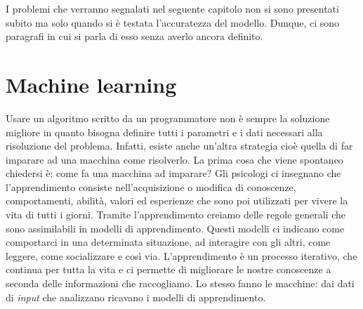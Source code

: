 I problemi che verranno segnalati nel seguente capitolo non si sono presentati subito ma solo quando si è testata l'accuratezza del modello. Dunque, ci sono paragrafi in cui si parla di esso senza averlo ancora definito.
\section{Machine learning}
Usare un algoritmo scritto da un programmatore non è sempre la soluzione migliore in quanto bisogna definire tutti i parametri e i dati necessari alla risoluzione del problema. Infatti, esiste anche un'altra strategia cioè quella di far imparare ad una macchina come risolverlo. La prima cosa che viene spontaneo chiedersi è: come fa una macchina ad imparare? Gli psicologi ci insegnano che l’apprendimento consiste nell’acquisizione o modifica di conoscenze, comportamenti, abilità, valori ed esperienze che sono poi utilizzati per vivere la vita di tutti i giorni. Tramite l’apprendimento creiamo delle regole generali che sono assimilabili in modelli di apprendimento. Questi modelli ci indicano come comportarci in una determinata situazione, ad interagire con gli altri, come leggere, come socializzare e così via. L’apprendimento è un processo iterativo, che continua per tutta la vita e ci permette di migliorare le nostre conoscenze a seconda delle informazioni che raccogliamo. Lo stesso fanno le macchine: dai dati di \textit{input} che analizzano ricavano i modelli di apprendimento.\\
\newline

